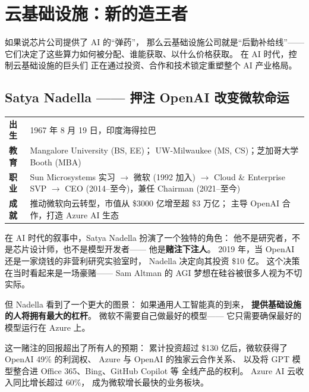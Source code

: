 \section{云基础设施：新的造王者}
\label{sec:cloud-infra}

如果说芯片公司提供了 AI 的``弹药''，
那么云基础设施公司就是``后勤补给线''——
它们决定了这些算力如何被分配、谁能获取、以什么价格获取。
在 AI 时代，控制云基础设施的巨头们
正在通过投资、合作和技术锁定重塑整个 AI 产业格局。

\subsection{Satya Nadella —— 押注 OpenAI 改变微软命运}
\label{subsec:nadella}

\begin{keybox}
\small
\begin{tabularx}{\textwidth}{lX}
\toprule
\textbf{出生} & 1967 年 8 月 19 日，印度海得拉巴 \\
\textbf{教育} & Mangalore University (BS, EE)；
                UW-Milwaukee (MS, CS)；芝加哥大学 Booth (MBA) \\
\textbf{职业} & Sun Microsystems 实习 $\to$ 微软 (1992 加入) $\to$
                Cloud \& Enterprise SVP $\to$
                CEO (2014--至今)，兼任 Chairman (2021--至今) \\
\textbf{成就} & 推动微软向云转型，市值从 \$3000 亿增至超 \$3 万亿；
                主导 OpenAI 合作，打造 Azure AI 生态 \\
\bottomrule
\end{tabularx}
\end{keybox}

在 AI 时代的叙事中，Satya Nadella 扮演了一个独特的角色：
他不是研究者，不是芯片设计师，也不是模型开发者——
他是\textbf{赌注下注人}。
2019 年，当 OpenAI 还是一家烧钱的非营利研究实验室时，
Nadella 决定向其投资 \$10 亿。
这个决策在当时看起来是一场豪赌——
Sam Altman 的 AGI 梦想在硅谷被很多人视为不切实际。

但 Nadella 看到了一个更大的图景：
如果通用人工智能真的到来，
\textbf{提供基础设施的人将拥有最大的杠杆}。
微软不需要自己做最好的模型——
它只需要确保最好的模型运行在 Azure 上。

这一赌注的回报超出了所有人的预期：
累计投资超过 \$130 亿后，微软获得了 OpenAI 49\% 的利润权、
Azure 与 OpenAI 的独家云合作关系、
以及将 GPT 模型整合进 Office 365、Bing、GitHub Copilot 等
全线产品的权利。
Azure AI 云收入同比增长超过 60\%，
成为微软增长最快的业务板块。

